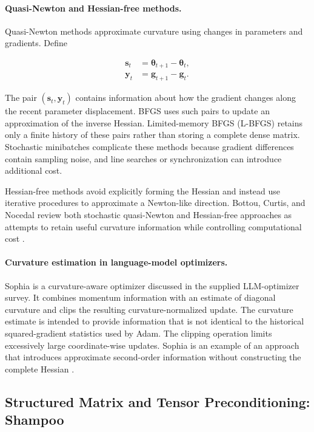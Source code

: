 \paragraph{Quasi-Newton and Hessian-free methods.}
Quasi-Newton methods approximate curvature using changes in parameters
and gradients. Define

\begin{align}
    \mathbf{s}_t
    &=
    \boldsymbol{\theta}_{t+1}-\boldsymbol{\theta}_t,
    \label{eq:opt-quasinewton-s}\\
    \mathbf{y}_t
    &=
    \mathbf{g}_{t+1}-\mathbf{g}_t.
    \label{eq:opt-quasinewton-y}
\end{align}

The pair $(\mathbf{s}_t,\mathbf{y}_t)$ contains information about how
the gradient changes along the recent parameter displacement. BFGS
uses such pairs to update an approximation of the inverse Hessian.
Limited-memory BFGS (L-BFGS) retains only a finite history of these
pairs rather than storing a complete dense matrix. Stochastic
minibatches complicate these methods because gradient differences
contain sampling noise, and line searches or synchronization can
introduce additional cost.

Hessian-free methods avoid explicitly forming the Hessian and instead
use iterative procedures to approximate a Newton-like direction.
Bottou, Curtis, and Nocedal review both stochastic quasi-Newton and
Hessian-free approaches as attempts to retain useful curvature
information while controlling computational cost
\parencite{Bottou2018Optimization}.

\paragraph{Curvature estimation in language-model optimizers.}
Sophia is a curvature-aware optimizer discussed in the supplied
LLM-optimizer survey. It combines momentum information with an
estimate of diagonal curvature and clips the resulting
curvature-normalized update. The curvature estimate is intended to
provide information that is not identical to the historical
squared-gradient statistics used by Adam. The clipping operation
limits excessively large coordinate-wise updates. Sophia is an
example of an approach that introduces approximate second-order
information without constructing the complete Hessian
\parencite{Ranganath2026Navigating}.

\subsection{Structured Matrix and Tensor Preconditioning: Shampoo}
\label{subsec:optimization-shampoo}


